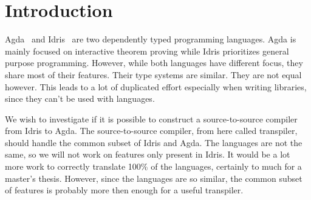 \documentclass[parskip=half]{scrartcl}
\begin{document}

%
%
%


%

\section{Introduction}

Agda~\cite{agda} and Idris~\cite{idris} are two dependently typed programming
languages.  Agda is mainly focused on interactive theorem proving while Idris
prioritizes general purpose programming.  However, while both languages have
different focus, they share most of their features. Their type systems are
similar. They are not equal however. This leads to a lot of duplicated effort
especially when writing libraries, since they can't be used with languages.

We wish to investigate if it is possible to construct a source-to-source
compiler from Idris to Agda. The source-to-source compiler, from here called
transpiler, should handle the common subset of Idris and Agda. The languages
are not the same, so we will not work on features only present in Idris. It
would be a lot more work to correctly translate 100\% of the languages,
certainly to much for a master's thesis. However, since the languages are so
similar, the common subset of features is probably more then enough for
a useful transpiler.
\end{document}
